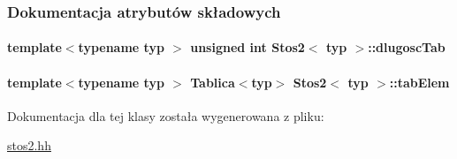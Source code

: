 \subsubsection{Dokumentacja atrybutów składowych}
\hypertarget{class_stos2_a4918ce0834c2e22875bbd2c3480dbf9d}{
\paragraph[{dlugosc\-Tab}]{\setlength{\rightskip}{0pt plus 5cm}template$<$typename typ $>$ unsigned int {\bf Stos2}$<$ typ $>$\-::dlugosc\-Tab\hspace{0.3cm}{\ttfamily [private]}}}\label{class_stos2_a4918ce0834c2e22875bbd2c3480dbf9d}
\hypertarget{class_stos2_af07d8fc33f08e22a4fdd5e4a29db7fd3}{
\paragraph[{tab\-Elem}]{\setlength{\rightskip}{0pt plus 5cm}template$<$typename typ $>$ {\bf Tablica}$<$typ$>$ {\bf Stos2}$<$ typ $>$\-::tab\-Elem\hspace{0.3cm}{\ttfamily [private]}}}\label{class_stos2_af07d8fc33f08e22a4fdd5e4a29db7fd3}


Dokumentacja dla tej klasy została wygenerowana z pliku\-:\begin{DoxyCompactItemize}
\item 
\hyperlink{stos2_8hh}{stos2.\-hh}\end{DoxyCompactItemize}
